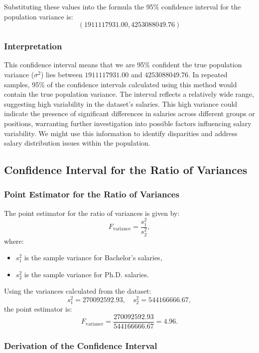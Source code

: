 \documentclass[12pt,a4paper]{article}
\begin{document}
Substituting these values into the formula the 95\% confidence interval for the population variance is:
\[
\left( 1911117931.00, 4253088049.76 \right)
\]

\subsubsection*{Interpretation}

This confidence interval means that we are 95\% confident the true population variance (\(\sigma^2\)) lies between \(1911117931.00\) and \(4253088049.76\). In repeated samples, 95\% of the confidence intervals calculated using this method would contain the true population variance. The interval reflects a relatively wide range, suggesting high variability in the dataset's salaries. This high variance could indicate the presence of significant differences in salaries across different groups or positions, warranting further investigation into possible factors influencing salary variability. We might use this information to identify disparities and address salary distribution issues within the population.
\newpage








\subsection*{Confidence Interval for the Ratio of Variances}

\subsubsection*{Point Estimator for the Ratio of Variances}

The point estimator for the ratio of variances is given by:
\[
F_{\text{variance}} = \frac{s_1^2}{s_2^2},
\]
where:
\begin{itemize}
    \item \( s_1^2 \) is the sample variance for Bachelor's salaries,
    \item \( s_2^2 \) is the sample variance for Ph.D. salaries.
\end{itemize}

Using the variances calculated from the dataset:
\[
s_1^2 = 270092592.93, \quad s_2^2 = 544166666.67,
\]
the point estimator is:
\[
F_{\text{variance}} = \frac{270092592.93}{544166666.67} = 4.96.
\]

\subsubsection*{Derivation of the Confidence Interval}
\end{document}
